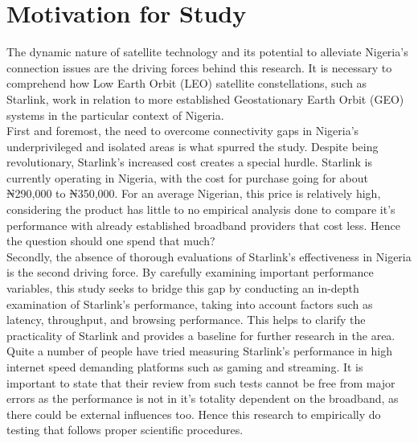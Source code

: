 \section{Motivation for Study}
The dynamic nature of satellite technology and its potential to alleviate Nigeria's connection issues are the driving forces behind this research. It is necessary to comprehend how Low Earth Orbit (LEO) satellite constellations, such as Starlink, work in relation to more established Geostationary Earth Orbit (GEO) systems in the particular context of Nigeria.\\
First and foremost, the need to overcome connectivity gaps in Nigeria's underprivileged and isolated areas is what spurred the study. Despite being revolutionary, Starlink's increased cost creates a special hurdle. Starlink is currently operating in Nigeria, with the cost for purchase going for about ₦290,000 to ₦350,000. For an average Nigerian, this price is relatively high, considering the product has little to no empirical analysis done to compare it's performance with already established broadband providers that cost less. Hence the question should one spend that much?\\
Secondly, the absence of thorough evaluations of Starlink's effectiveness in Nigeria is the second driving force. By carefully examining important performance variables, this study seeks to bridge this gap by conducting an in-depth examination of Starlink's performance, taking into account factors such as latency, throughput, and browsing performance. This helps to clarify the practicality of Starlink and provides a baseline for further research in the area.\\
Quite a number of people have tried measuring Starlink's performance in high internet speed demanding platforms such as gaming and streaming. It is important to state that their review from such tests cannot be free from major errors as the performance is not in it's totality dependent on the broadband, as there could be external influences too. Hence this research to empirically do testing that follows proper scientific procedures.

